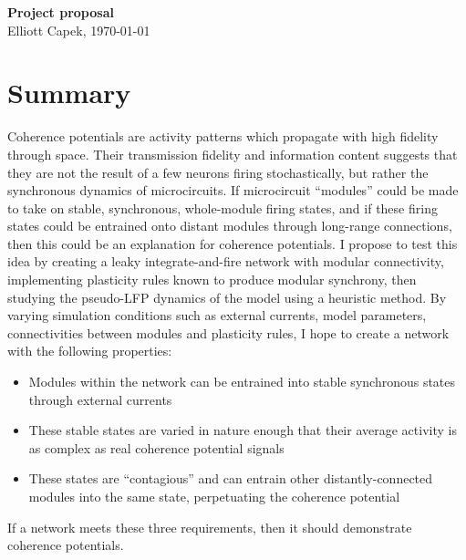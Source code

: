 \documentclass[a4paper, 12pt]{article}
\begin{document}
\noindent
\huge\textbf{Project proposal}\\

\large Elliott Capek, \today
\normalsize

\section*{Summary}
Coherence potentials are activity patterns which propagate with high fidelity through space. Their transmission fidelity and information content suggests that they are not the result of a few neurons firing stochastically, but rather the synchronous dynamics of microcircuits. If microcircuit ``modules'' could be made to take on stable, synchronous, whole-module firing states, and if these firing states could be entrained onto distant modules through long-range connections, then this could be an explanation for coherence potentials. I propose to test this idea by creating a leaky integrate-and-fire network with modular connectivity, implementing plasticity rules known to produce modular synchrony, then studying the pseudo-LFP dynamics of the model using a heuristic method. By varying simulation conditions such as external currents, model parameters, connectivities between modules and plasticity rules, I hope to create a network with the following properties:

\begin{itemize}
\item Modules within the network can be entrained into stable synchronous states through external currents
\item These stable states are varied in nature enough that their average activity is as complex as real coherence potential signals
\item These states are ``contagious'' and can entrain other distantly-connected modules into the same state, perpetuating the coherence potential
\end{itemize}

If a network meets these three requirements, then it should demonstrate coherence potentials.
\end{document}
